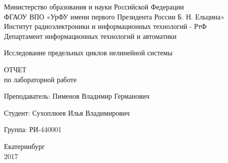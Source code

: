 \begin{center}
  Министерство образования и науки Российской Федерации\\
  ФГАОУ ВПО  «УрФУ имени первого Президента России Б. Н. Ельцина»\\
  Институт радиоэлектроники и информационных технологий - РтФ\\
  Департамент информационных технологий и автоматики
  \par
  \vspace{4.5cm}
  \Large{
    Исследование предельных циклов нелинейной системы

    \par
    \vspace{0.5cm}

    ОТЧЕТ\\
    по лабораторной работе
  }

  \vspace{4cm}
  {
    Преподаватель: \hfill Пименов Владимир Германович
  }
  \par
  {
    Студент: \hfill Сухоплюев Илья Владимирович
  }
  \par
  {
    Группа: \hfill РИ-440001
  }

  \par
  \vspace{3.5cm}
  Екатеринбург\\
  2017
\end{center}
